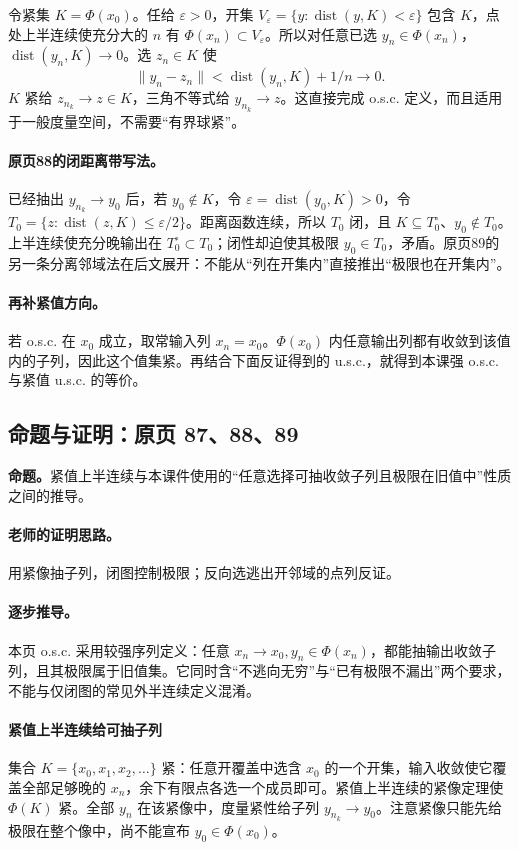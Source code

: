 \documentclass[11pt,a4paper]{article}
\newcommand{\eps}{\varepsilon}
\DeclareMathOperator{\dist}{dist}
\theoremstyle{definition}\newtheorem{definition}{定义}\newtheorem{example}{例}
\begin{document}
令紧集 $K=\Phi(x_0)$。任给 $\eps>0$，开集 $V_\eps=\{y:\dist(y,K)<\eps\}$ 包含 $K$，点处上半连续使充分大的 $n$ 有 $\Phi(x_n)\subset V_\eps$。所以对任意已选 $y_n\in\Phi(x_n)$，$\dist(y_n,K)\to0$。选 $z_n\in K$ 使
\[\|y_n-z_n\|<\dist(y_n,K)+1/n\longrightarrow0.\]
$K$ 紧给 $z_{n_k}\to z\in K$，三角不等式给 $y_{n_k}\to z$。这直接完成 o.s.c. 定义，而且适用于一般度量空间，不需要“有界球紧”。

\paragraph{原页88的闭距离带写法。}
已经抽出 $y_{n_k}\to y_0$ 后，若 $y_0\notin K$，令 $\eps=\dist(y_0,K)>0$，令 $T_0=\{z:\dist(z,K)\le\eps/2\}$。距离函数连续，所以 $T_0$ 闭，且 $K\subseteq T_0^\circ$、$y_0\notin T_0$。上半连续使充分晚输出在 $T_0^\circ\subset T_0$；闭性却迫使其极限 $y_0\in T_0$，矛盾。原页89的另一条分离邻域法在后文展开：不能从“列在开集内”直接推出“极限也在开集内”。

\paragraph{再补紧值方向。}
若 o.s.c. 在 $x_0$ 成立，取常输入列 $x_n=x_0$。$\Phi(x_0)$ 内任意输出列都有收敛到该值内的子列，因此这个值集紧。再结合下面反证得到的 u.s.c.，就得到本课强 o.s.c. 与紧值 u.s.c. 的等价。


\subsection{命题与证明：原页 87、88、89}

\textbf{命题。}紧值上半连续与本课件使用的“任意选择可抽收敛子列且极限在旧值中”性质之间的推导。

\paragraph{老师的证明思路。}用紧像抽子列，闭图控制极限；反向选逃出开邻域的点列反证。

\paragraph{逐步推导。}
本页 o.s.c. 采用较强序列定义：任意 $x_n\to x_0,y_n\in\Phi(x_n)$，都能抽输出收敛子列，且其极限属于旧值集。它同时含“不逃向无穷”与“已有极限不漏出”两个要求，不能与仅闭图的常见外半连续定义混淆。
\paragraph{紧值上半连续给可抽子列}
集合 $K=\{x_0,x_1,x_2,\ldots\}$ 紧：任意开覆盖中选含 $x_0$ 的一个开集，输入收敛使它覆盖全部足够晚的 $x_n$，余下有限点各选一个成员即可。紧值上半连续的紧像定理使 $\Phi(K)$ 紧。全部 $y_n$ 在该紧像中，度量紧性给子列 $y_{n_k}\to y_0$。注意紧像只能先给极限在整个像中，尚不能宣布 $y_0\in\Phi(x_0)$。
\end{document}
